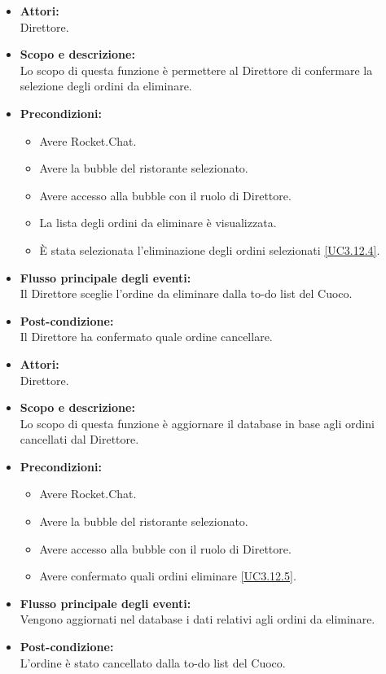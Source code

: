 
\begin{itemize}
	\item \textbf{Attori:}
	\\Direttore.
	\item \textbf{Scopo e descrizione:} 
	\\Lo scopo di questa funzione è permettere al Direttore di confermare la selezione degli ordini da eliminare.
	\item \textbf{Precondizioni:}
	\begin{itemize}
		\item Avere Rocket.Chat.
		\item Avere la bubble del ristorante selezionato.
		\item Avere accesso alla bubble con il ruolo di Direttore.
		\item La lista degli ordini da eliminare è visualizzata.
		\item È stata selezionata l'eliminazione degli ordini selezionati \ref{UC3.12.4}.
	\end{itemize}
	\item \textbf{Flusso principale degli eventi:}
	\\Il Direttore sceglie l'ordine da eliminare dalla to-do list del Cuoco.
	\item \textbf{Post-condizione:}
	\\Il Direttore ha confermato quale ordine cancellare.
\end{itemize}


\begin{itemize}
	\item \textbf{Attori:}
	\\Direttore.
	\item \textbf{Scopo e descrizione:} 
	\\Lo scopo di questa funzione è aggiornare il database in base agli ordini cancellati dal Direttore.
	\item \textbf{Precondizioni:}
	\begin{itemize}
		\item Avere Rocket.Chat.
		\item Avere la bubble del ristorante selezionato.
		\item Avere accesso alla bubble con il ruolo di Direttore.
		\item Avere confermato quali ordini eliminare \ref{UC3.12.5}.
	\end{itemize}
	\item \textbf{Flusso principale degli eventi:}
	\\Vengono aggiornati nel database i dati relativi agli ordini da eliminare.
	\item \textbf{Post-condizione:}
	\\L'ordine è stato cancellato dalla to-do list del Cuoco.
\end{itemize}


